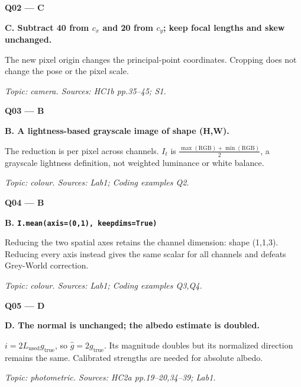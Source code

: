 \documentclass[11pt,a4paper]{article}
\begin{document}
\par\vspace{12pt}
\begin{minipage}{\linewidth}
\textbf{Q02 — C}\par\smallskip
\textbf{C. Subtract 40 from \(c_x\) and 20 from \(c_y\); keep focal lengths and skew unchanged.}\par
The new pixel origin changes the principal-point coordinates. Cropping does not change the pose or the pixel scale.\par
{\small\itshape Topic: camera. Sources: HC1b pp.35–45; S1.}

\end{minipage}
\par\vspace{12pt}
\begin{minipage}{\linewidth}
\textbf{Q03 — B}\par\smallskip
\textbf{B. A lightness-based grayscale image of shape (H,\allowbreak{}W).}\par
The reduction is per pixel across channels. \(I_t\) is \(\frac{\max(\mathrm{RGB})+\min(\mathrm{RGB})}{2}\),\allowbreak{} a grayscale lightness definition,\allowbreak{} not weighted luminance or white balance.\par
{\small\itshape Topic: colour. Sources: Lab1; Coding examples Q2.}

\end{minipage}
\par\vspace{12pt}
\begin{minipage}{\linewidth}
\textbf{Q04 — B}\par\smallskip
\textbf{B. \texttt{I.mean(axis=\allowbreak{}(0,\allowbreak{}1),\allowbreak{} keepdims=\allowbreak{}True)}}\par
Reducing the two spatial axes retains the channel dimension: shape (1,\allowbreak{}1,\allowbreak{}3). Reducing every axis instead gives the same scalar for all channels and defeats Grey-World correction.\par
{\small\itshape Topic: colour. Sources: Lab1; Coding examples Q3,\allowbreak{}Q4.}

\end{minipage}
\par\vspace{12pt}
\begin{minipage}{\linewidth}
\textbf{Q05 — D}\par\smallskip
\textbf{D. The normal is unchanged; the albedo estimate is doubled.}\par
\(i=2L_{\mathrm{used}}g_{\mathrm{true}}\),\allowbreak{} so \(\widehat g=2g_{\mathrm{true}}\). Its magnitude doubles but its normalized direction remains the same. Calibrated strengths are needed for absolute albedo.\par
{\small\itshape Topic: photometric. Sources: HC2a pp.19–20,\allowbreak{}34–39; Lab1.}

\end{minipage}
\end{document}
